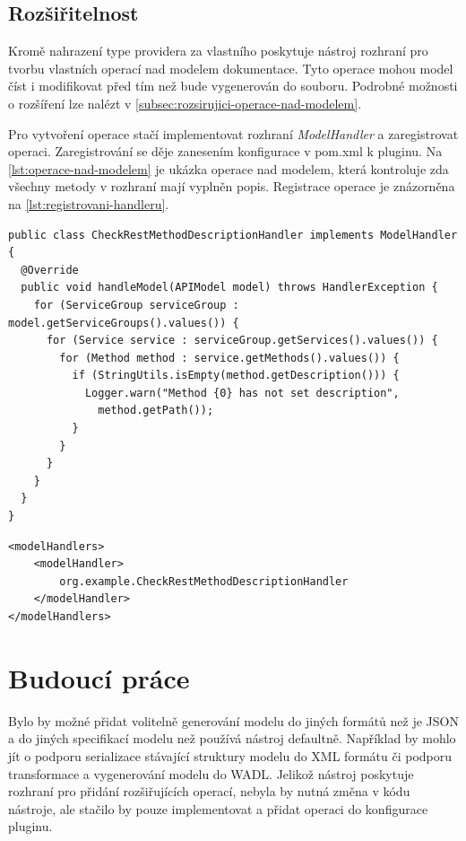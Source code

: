 \documentclass[11pt,twoside,a4paper]{book}
\begin{document}
\section{Rozšiřitelnost}

Kromě nahrazení type providera za vlastního poskytuje nástroj rozhraní pro
tvorbu vlastních operací nad modelem dokumentace. Tyto operace mohou model číst
i modifikovat před tím než bude vygenerován do souboru. Podrobné možnosti o
rozšíření lze nalézt v \ref{subsec:rozsirujici-operace-nad-modelem}.

Pro vytvoření operace stačí implementovat rozhraní {\em ModelHandler} a
zaregistrovat operaci. Zaregistrování se děje zanesením konfigurace v pom.xml k
pluginu. Na \ref{lst:operace-nad-modelem} je ukázka operace nad modelem, která
kontroluje zda všechny metody v rozhraní mají vyplněn popis. Registrace operace
je znázorněna na \ref{lst:registrovani-handleru}.

\begin{lstlisting}[frame=single, caption={Ukázka použití operace nad modelem},
basicstyle=\small, label={lst:operace-nad-modelem}] 
public class CheckRestMethodDescriptionHandler implements ModelHandler {
  @Override
  public void handleModel(APIModel model) throws HandlerException {
    for (ServiceGroup serviceGroup : model.getServiceGroups().values()) {
      for (Service service : serviceGroup.getServices().values()) {
        for (Method method : service.getMethods().values()) {
          if (StringUtils.isEmpty(method.getDescription())) {
            Logger.warn("Method {0} has not set description",
              method.getPath());
          }
        }
      }
    }
  }
}
\end{lstlisting}

\begin{lstlisting}[frame=single, caption={Registrování handleru pro model},
label={lst:registrovani-handleru}] 
<modelHandlers>
    <modelHandler>
        org.example.CheckRestMethodDescriptionHandler
    </modelHandler>
</modelHandlers>
\end{lstlisting}

\chapter{Budoucí práce}

Bylo by možné přidat volitelně generování modelu do jiných formátů než je JSON a
do jiných specifikací modelu než používá nástroj defaultně. Například by mohlo
jít o podporu serializace stávající struktury modelu do XML formátu či podporu
transformace a vygenerování modelu do WADL. Jelikož nástroj poskytuje rozhraní
pro přidání rozšiřujících operací, nebyla by nutná změna v kódu nástroje, ale
stačilo by pouze implementovat a přidat operaci do konfigurace pluginu.
\end{document}

